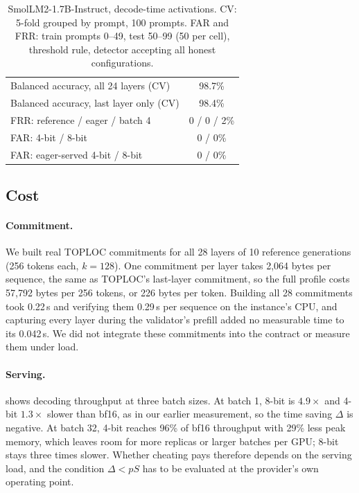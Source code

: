 \documentclass[10pt,twocolumn]{article}
\begin{document}
\begin{table}[!htb]
\centering
\small
\caption{SmolLM2-1.7B-Instruct, decode-time activations. CV: 5-fold grouped by prompt, 100 prompts. FAR and FRR: train prompts 0--49, test 50--99 (50 per cell), threshold rule, detector accepting all honest configurations.}
\label{tab:smol}
\begin{tabular}{@{}lc@{}}
\toprule
Balanced accuracy, all 24 layers (CV) & 98.7\% \\
Balanced accuracy, last layer only (CV) & 98.4\% \\
FRR: reference / eager / batch 4 & 0 / 0 / 2\% \\
FAR: 4-bit / 8-bit & 0 / 0\% \\
FAR: eager-served 4-bit / 8-bit & 0 / 0\% \\
\bottomrule
\end{tabular}
\end{table}


\subsection{Cost}
\label{sec:res-cost}

\paragraph{Commitment.}
We built real TOPLOC commitments for all 28 layers of 10 reference generations (256 tokens each, $k{=}128$).
One commitment per layer takes 2{,}064 bytes per sequence, the same as TOPLOC's last-layer commitment, so the full profile costs 57{,}792 bytes per 256 tokens, or 226 bytes per token.
Building all 28 commitments took 0.22\,s and verifying them 0.29\,s per sequence on the instance's CPU, and capturing every layer during the validator's prefill added no measurable time to its 0.042\,s.
We did not integrate these commitments into the contract or measure them under load.

\paragraph{Serving.}
 shows decoding throughput at three batch sizes.
At batch 1, 8-bit is $4.9\times$ and 4-bit $1.3\times$ slower than bf16, as in our earlier measurement, so the time saving $\Delta$ is negative.
At batch 32, 4-bit reaches 96\% of bf16 throughput with 29\% less peak memory, which leaves room for more replicas or larger batches per GPU; 8-bit stays three times slower.
Whether cheating pays therefore depends on the serving load, and the condition $\Delta < pS$ has to be evaluated at the provider's own operating point.
\end{document}
